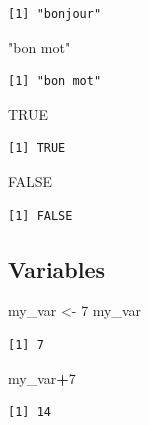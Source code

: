 \documentclass[]{book}
\newenvironment{Shaded}{\begin{snugshade}}{\end{snugshade}}
\newcommand{\DecValTok}[1]{\textcolor[rgb]{0.00,0.00,0.81}{#1}}
\newcommand{\StringTok}[1]{\textcolor[rgb]{0.31,0.60,0.02}{#1}}
\newcommand{\OtherTok}[1]{\textcolor[rgb]{0.56,0.35,0.01}{#1}}
\newcommand{\OperatorTok}[1]{\textcolor[rgb]{0.81,0.36,0.00}{\textbf{#1}}}
\newcommand{\NormalTok}[1]{#1}
\theoremstyle{definition}
\theoremstyle{definition}
\theoremstyle{definition}
\theoremstyle{remark}
\begin{document}
\begin{verbatim}
[1] "bonjour"
\end{verbatim}

\begin{Shaded}
\begin{Highlighting}[]
\StringTok{"bon mot"}
\end{Highlighting}
\end{Shaded}

\begin{verbatim}
[1] "bon mot"
\end{verbatim}

\begin{Shaded}
\begin{Highlighting}[]
\OtherTok{TRUE}
\end{Highlighting}
\end{Shaded}

\begin{verbatim}
[1] TRUE
\end{verbatim}

\begin{Shaded}
\begin{Highlighting}[]
\OtherTok{FALSE}
\end{Highlighting}
\end{Shaded}

\begin{verbatim}
[1] FALSE
\end{verbatim}

\subsection{Variables}\label{variables}

\begin{Shaded}
\begin{Highlighting}[]
\NormalTok{my_var <-}\StringTok{ }\DecValTok{7}
\NormalTok{my_var}
\end{Highlighting}
\end{Shaded}

\begin{verbatim}
[1] 7
\end{verbatim}

\begin{Shaded}
\begin{Highlighting}[]
\NormalTok{my_var}\OperatorTok{+}\DecValTok{7}
\end{Highlighting}
\end{Shaded}

\begin{verbatim}
[1] 14
\end{verbatim}
\end{document}
